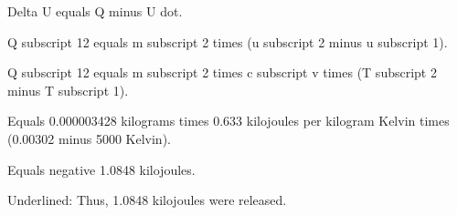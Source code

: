 Delta U equals Q minus U dot.

Q subscript 12 equals m subscript 2 times (u subscript 2 minus u subscript 1).

Q subscript 12 equals m subscript 2 times c subscript v times (T subscript 2 minus T subscript 1).

Equals 0.000003428 kilograms times 0.633 kilojoules per kilogram Kelvin times (0.00302 minus 5000 Kelvin).

Equals negative 1.0848 kilojoules.

Underlined: Thus, 1.0848 kilojoules were released.